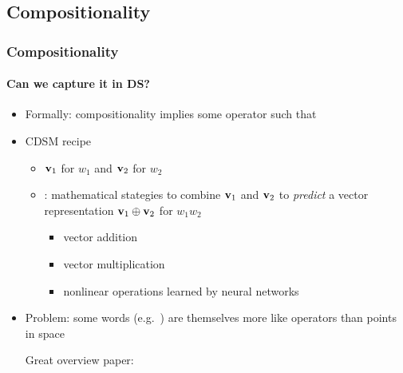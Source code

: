 \documentclass[t]{beamer} %
\begin{document}
\subsection{Compositionality}

\begin{frame}
  \frametitle{Compositionality}
  \framesubtitle{Can we capture it in DS?}

  \begin{itemize}
  \item Formally: compositionality implies some operator \primary{$\bigoplus$}  such
    that 

    \begin{center}
    \end{center}

  \item{CDSM recipe}
    \begin{itemize}
    \item {} $\vv_1$ for $w_1$ and $\vv_2$ for $w_2$
    \item {}: mathematical stategies to combine $\vv_1$ and $\vv_2$ to \textit{predict} a vector representation $\vv_1 \oplus \vv_2$ for $w_1 w_2$
      \begin{itemize}
      \item vector addition
      \item vector multiplication
      \item nonlinear operations learned by neural networks
      \end{itemize}
    \end{itemize} 
  \item Problem: some words (e.g.\ ) are themselves more like  operators than points in space

    \vfill
    Great overview paper:  \citep{Baroni:Bernardi:Zamparelli:14}	
  \end{itemize}
\end{frame}
\end{document}
